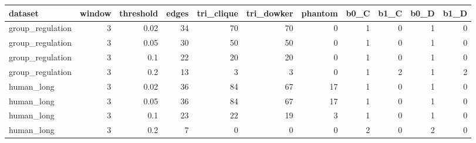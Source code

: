 \begin{tabular}{lrrrrrrrrrr}
\toprule
dataset & window & threshold & edges & tri\_clique & tri\_dowker & phantom & b0\_C & b1\_C & b0\_D & b1\_D \\
\midrule
group_regulation & 3 & 0.02 & 34 & 70 & 70 & 0 & 1 & 0 & 1 & 0 \\
group_regulation & 3 & 0.05 & 30 & 50 & 50 & 0 & 1 & 0 & 1 & 0 \\
group_regulation & 3 & 0.1 & 22 & 20 & 20 & 0 & 1 & 0 & 1 & 0 \\
group_regulation & 3 & 0.2 & 13 & 3 & 3 & 0 & 1 & 2 & 1 & 2 \\
human_long & 3 & 0.02 & 36 & 84 & 67 & 17 & 1 & 0 & 1 & 0 \\
human_long & 3 & 0.05 & 36 & 84 & 67 & 17 & 1 & 0 & 1 & 0 \\
human_long & 3 & 0.1 & 23 & 22 & 19 & 3 & 1 & 0 & 1 & 0 \\
human_long & 3 & 0.2 & 7 & 0 & 0 & 0 & 2 & 0 & 2 & 0 \\
\bottomrule
\end{tabular}
